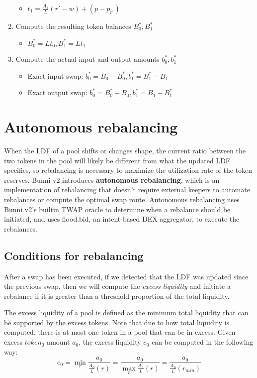 \documentclass[twocolumn]{article}
\begin{document}
\begin{enumerate}
\begin{itemize}
      \item $t_1=\frac{A_1}{L}(r'-w) + (p - p_{r'})$
    \end{itemize}  
  \item Compute the resulting token balances $B_0^*, B_1^*$
    \begin{itemize}
      \item $B_0^* = Lt_0, B_1^* = Lt_1$  
    \end{itemize}
  \item Compute the actual input and output amounts $b_0^*, b_1^*$ 
    \begin{itemize}
      \item Exact input swap: $b_0^* = B_0 - B_0^*, b_1^* = B_1^* - B_1$
      \item Exact output swap: $b_0^* = B_0^* - B_0, b_1^* = B_1 - B_1^*$
    \end{itemize}
\end{enumerate}

\section{Autonomous rebalancing}

When the LDF of a pool shifts or changes shape, the current ratio between the two tokens in the pool will likely be different from what the updated LDF specifies, so rebalancing is necessary to maximize the utilization rate of the token reserves. Bunni v2 introduces \textbf{autonomous rebalancing}, which is an implementation of rebalancing that doesn't require external keepers to automate rebalances or compute the optimal swap route. Autonomous rebalancing uses Bunni v2's builtin TWAP oracle to determine when a rebalance should be initiated, and uses flood.bid, an intent-based DEX aggregator, to execute the rebalances.

\subsection{Conditions for rebalancing}

After a swap has been executed, if we detected that the LDF was updated since the previous swap, then we will compute the \textit{excess liquidity} and initiate a rebalance if it is greater than a threshold proportion of the total liquidity.

The excess liquidity of a pool is defined as the minimum total liquidity that can be supported by the excess tokens. Note that due to how total liquidity is computed, there is at most one token in a pool that can be in excess. Given excess $token_0$ amount $a_0$, the excess liquidity $e_0$ can be computed in the following way:
\begin{equation}
  e_0 = \min_r \frac{a_0}{\frac{A_0}{L}(r)} = \frac{a_0}{\max_r \frac{A_0}{L}(r)} = \frac{a_0}{\frac{A_0}{L}(r_{min})}
\end{equation}
\end{document}

